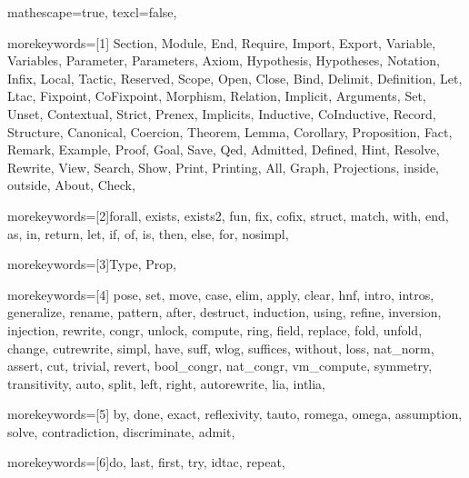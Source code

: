 
 {

mathescape=true,
texcl=false,


morekeywords=[1]{
Section, Module, End, Require, Import, Export,
Variable, Variables, Parameter, Parameters, Axiom, Hypothesis, Hypotheses,
Notation, Infix, Local, Tactic, Reserved, Scope, Open, Close, Bind, Delimit,
Definition, Let, Ltac, Fixpoint, CoFixpoint, Morphism, Relation,
Implicit, Arguments, Set, Unset, Contextual, Strict, Prenex, Implicits,
Inductive, CoInductive, Record, Structure, Canonical, Coercion,
Theorem, Lemma, Corollary, Proposition, Fact, Remark, Example,
Proof, Goal, Save, Qed, Admitted, Defined, Hint, Resolve, Rewrite, View,
Search, Show, Print, Printing, All, Graph, Projections,
inside, outside,
About, Check},


morekeywords=[2]{forall, exists, exists2, fun, fix, cofix, struct,
      match, with, end, as, in, return, let, if, of, is, then, else,
      for, nosimpl},

morekeywords=[3]{Type, Prop},

morekeywords=[4]{
         pose, set, move, case, elim, apply, clear,
            hnf, intro, intros, generalize, rename, pattern, after,
            destruct, induction, using, refine, inversion, injection,
         rewrite, congr, unlock, compute, ring, field,
            replace, fold, unfold, change, cutrewrite, simpl,
         have, suff, wlog, suffices, without, loss, nat_norm,
            assert, cut, trivial, revert, bool_congr, nat_congr, vm_compute,
         symmetry, transitivity, auto, split, left, right,
         autorewrite, lia, intlia},

morekeywords=[5]{
         by, done, exact, reflexivity, tauto, romega, omega,
         assumption, solve, contradiction, discriminate, admit},


morekeywords=[6]{do, last, first, try, idtac, repeat},

}
